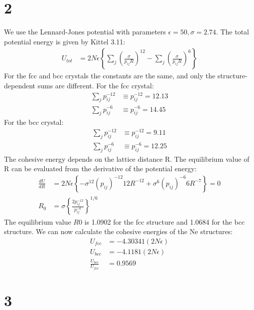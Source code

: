 \documentclass[a4paper,11pt]{article}
\numberwithin{equation}{section}
\newcommand{\lrp}[1]{\left({#1}\right)}
\newcommand{\lrb}[1]{\left\{{#1}\right\}}
\begin{document}
\section*{2}
We use the Lennard-Jones potential with parameters $\epsilon=50, \sigma=2.74$.
The total potential energy is given by Kittel 3.11:
\begin{align}
 U_{tot} &= 2N\epsilon\lrb{\sum_j\lrp{\frac{\sigma}{p_{ij}R}}^{12}-\sum_j\lrp{\frac{\sigma}{p_{ij}R}}^6 }
\end{align}
For the fcc and bcc crystals the constants are the same, and only the structure-dependent sums are different. 
For the fcc crystal:
\begin{align}
 \sum_j p_{ij}^{-12} &\equiv p_{ij}^{-12} = 12.13\\
 \sum_j p_{ij}^{-6} &\equiv p_{ij}^{-6} = 14.45
\end{align}
For the bcc crystal:
\begin{align}
 \sum_j p_{ij}^{-12} &\equiv p_{ij}^{-12} = 9.11\\
 \sum_j p_{ij}^{-6} &\equiv p_{ij}^{-6} = 12.25
\end{align}
The cohesive energy depends on the lattice distance R. 
The equilibrium value of R can be evaluated from the derivative of the potential energy:
\begin{align}
 \frac{dU}{dR} &= 2N\epsilon\lrb{-\sigma^{12}\lrp{p_{ij}}^{-12}12R^{-12}+\sigma^{6}\lrp{p_{ij}}^{-6}6R^{-7}} = 0\\
 R_0 &= \sigma\lrb{\frac{2p_{ij}^{-12}}{p_{ij}^{-6}}}^{1/6}
\end{align}
The equilibrium value $R0$ is 1.0902 for the fcc structure and 1.0684 for the bcc structure. 
We can now calculate the cohesive energies of the Ne structures:
\begin{align}
 U_{fcc} &= -4.30341(2N\epsilon)\\
 U_{bcc} &= -4.1181(2N\epsilon)\\
 \frac{U_{bcc}}{U_{fcc}} &= 0.9569
\end{align}

\section*{3}  
\end{document}
